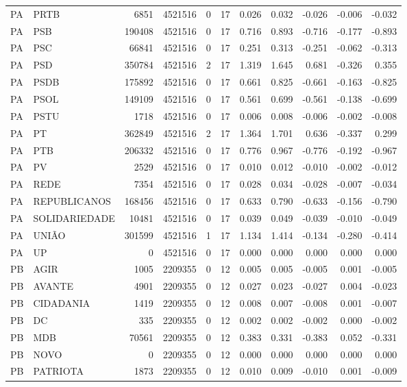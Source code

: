 \begin{landscape}
\begin{longtable}{llrrrrrrrrr}
PA & PRTB & 6851 & 4521516 & 0 & 17 & 0.026 & 0.032 & -0.026 & -0.006 & -0.032 \\
PA & PSB & 190408 & 4521516 & 0 & 17 & 0.716 & 0.893 & -0.716 & -0.177 & -0.893 \\
PA & PSC & 66841 & 4521516 & 0 & 17 & 0.251 & 0.313 & -0.251 & -0.062 & -0.313 \\
PA & PSD & 350784 & 4521516 & 2 & 17 & 1.319 & 1.645 & 0.681 & -0.326 & 0.355 \\
PA & PSDB & 175892 & 4521516 & 0 & 17 & 0.661 & 0.825 & -0.661 & -0.163 & -0.825 \\
PA & PSOL & 149109 & 4521516 & 0 & 17 & 0.561 & 0.699 & -0.561 & -0.138 & -0.699 \\
PA & PSTU & 1718 & 4521516 & 0 & 17 & 0.006 & 0.008 & -0.006 & -0.002 & -0.008 \\
PA & PT & 362849 & 4521516 & 2 & 17 & 1.364 & 1.701 & 0.636 & -0.337 & 0.299 \\
PA & PTB & 206332 & 4521516 & 0 & 17 & 0.776 & 0.967 & -0.776 & -0.192 & -0.967 \\
PA & PV & 2529 & 4521516 & 0 & 17 & 0.010 & 0.012 & -0.010 & -0.002 & -0.012 \\
PA & REDE & 7354 & 4521516 & 0 & 17 & 0.028 & 0.034 & -0.028 & -0.007 & -0.034 \\
PA & REPUBLICANOS & 168456 & 4521516 & 0 & 17 & 0.633 & 0.790 & -0.633 & -0.156 & -0.790 \\
PA & SOLIDARIEDADE & 10481 & 4521516 & 0 & 17 & 0.039 & 0.049 & -0.039 & -0.010 & -0.049 \\
PA & UNIÃO & 301599 & 4521516 & 1 & 17 & 1.134 & 1.414 & -0.134 & -0.280 & -0.414 \\
PA & UP & 0 & 4521516 & 0 & 17 & 0.000 & 0.000 & 0.000 & 0.000 & 0.000 \\
PB & AGIR & 1005 & 2209355 & 0 & 12 & 0.005 & 0.005 & -0.005 & 0.001 & -0.005 \\
PB & AVANTE & 4901 & 2209355 & 0 & 12 & 0.027 & 0.023 & -0.027 & 0.004 & -0.023 \\
PB & CIDADANIA & 1419 & 2209355 & 0 & 12 & 0.008 & 0.007 & -0.008 & 0.001 & -0.007 \\
PB & DC & 335 & 2209355 & 0 & 12 & 0.002 & 0.002 & -0.002 & 0.000 & -0.002 \\
PB & MDB & 70561 & 2209355 & 0 & 12 & 0.383 & 0.331 & -0.383 & 0.052 & -0.331 \\
PB & NOVO & 0 & 2209355 & 0 & 12 & 0.000 & 0.000 & 0.000 & 0.000 & 0.000 \\
PB & PATRIOTA & 1873 & 2209355 & 0 & 12 & 0.010 & 0.009 & -0.010 & 0.001 & -0.009 \\

\end{longtable}
\end{landscape}
